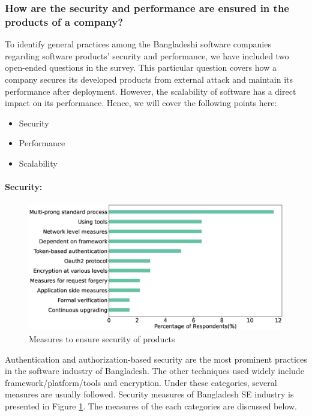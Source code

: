 \subsubsection{How are the security and performance are ensured in the products of a company?}
\label{security_performance}

To identify general practices among the Bangladeshi software companies regarding software products' security and performance, we have included two open-ended questions in the survey. This particular question covers how a company secures its developed products from external attack and maintain its performance after deployment. However, the scalability of software has a direct impact on its performance\cite{Liu2009,Bondi2000}. Hence, we will cover the following points here:
\begin{itemize}
    \item Security
    \item Performance
    \item Scalability
\end{itemize}


\paragraph{Security:}
\label{Security}

\begin{figure}[h]
\centering
\includegraphics[scale=0.22]{Figures/Security.eps} 
\caption{Measures to ensure security of products}
\label{fig:Measures to ensure security}
\end{figure}


Authentication and authorization-based security are the most prominent practices in the software industry of Bangladesh. The other techniques used widely include framework/platform/tools and encryption. Under these categories, several measures are usually followed. Security measures of Bangladesh SE industry is presented in Figure \ref{fig:Measures to ensure security}. The measures of the each categories are discussed below.


